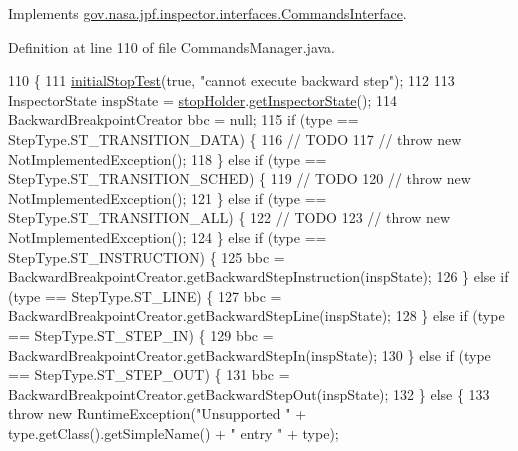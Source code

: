 Implements \hyperlink{interfacegov_1_1nasa_1_1jpf_1_1inspector_1_1interfaces_1_1_commands_interface_a6a6a733100d8162d5f18063519a88257}{gov.\+nasa.\+jpf.\+inspector.\+interfaces.\+Commands\+Interface}.



Definition at line 110 of file Commands\+Manager.\+java.


\begin{DoxyCode}
110                                                                                     \{
111     \hyperlink{classgov_1_1nasa_1_1jpf_1_1inspector_1_1server_1_1breakpoints_1_1_commands_manager_afe4795e1382183ef74cf03ea0b277c13}{initialStopTest}(\textcolor{keyword}{true}, \textcolor{stringliteral}{"cannot execute backward step"});
112 
113     InspectorState inspState = \hyperlink{classgov_1_1nasa_1_1jpf_1_1inspector_1_1server_1_1breakpoints_1_1_commands_manager_a3573f950aba2548e59f2c4f7c193b307}{stopHolder}.\hyperlink{classgov_1_1nasa_1_1jpf_1_1inspector_1_1server_1_1jpf_1_1_stop_holder_a1bad9bde4a6af463706584a73c3dd5e2}{getInspectorState}();
114     BackwardBreakpointCreator bbc = null;
115     \textcolor{keywordflow}{if} (type == StepType.ST\_TRANSITION\_DATA) \{
116       \textcolor{comment}{// TODO}
117       \textcolor{comment}{// throw new NotImplementedException();}
118     \} \textcolor{keywordflow}{else} \textcolor{keywordflow}{if} (type == StepType.ST\_TRANSITION\_SCHED) \{
119       \textcolor{comment}{// TODO}
120       \textcolor{comment}{// throw new NotImplementedException();}
121     \} \textcolor{keywordflow}{else} \textcolor{keywordflow}{if} (type == StepType.ST\_TRANSITION\_ALL) \{
122       \textcolor{comment}{// TODO}
123       \textcolor{comment}{// throw new NotImplementedException();}
124     \} \textcolor{keywordflow}{else} \textcolor{keywordflow}{if} (type == StepType.ST\_INSTRUCTION) \{
125       bbc = BackwardBreakpointCreator.getBackwardStepInstruction(inspState);
126     \} \textcolor{keywordflow}{else} \textcolor{keywordflow}{if} (type == StepType.ST\_LINE) \{
127       bbc = BackwardBreakpointCreator.getBackwardStepLine(inspState);
128     \} \textcolor{keywordflow}{else} \textcolor{keywordflow}{if} (type == StepType.ST\_STEP\_IN) \{
129       bbc = BackwardBreakpointCreator.getBackwardStepIn(inspState);
130     \} \textcolor{keywordflow}{else} \textcolor{keywordflow}{if} (type == StepType.ST\_STEP\_OUT) \{
131       bbc = BackwardBreakpointCreator.getBackwardStepOut(inspState);
132     \} \textcolor{keywordflow}{else} \{
133       \textcolor{keywordflow}{throw} \textcolor{keyword}{new} RuntimeException(\textcolor{stringliteral}{"Unsupported "} + type.getClass().getSimpleName() + \textcolor{stringliteral}{" entry "} + type);

\end{DoxyCode}
